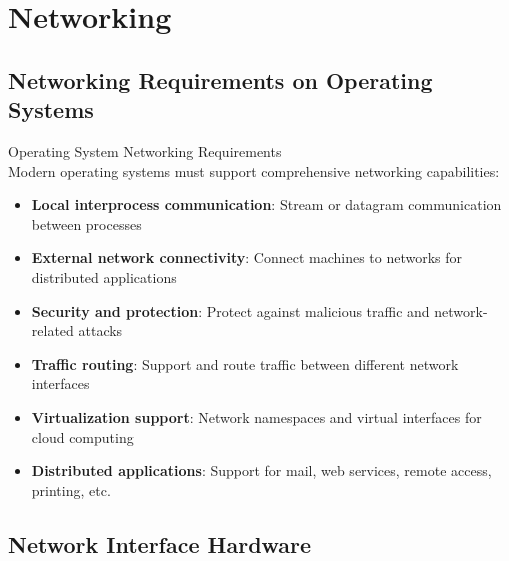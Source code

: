 \section{Networking}

\subsection{Networking Requirements on Operating Systems}

\begin{concept}{Operating System Networking Requirements}\\
    Modern operating systems must support comprehensive networking capabilities:
    \begin{itemize}
        \item \textbf{Local interprocess communication}: Stream or datagram communication between processes
        \item \textbf{External network connectivity}: Connect machines to networks for distributed applications
        \item \textbf{Security and protection}: Protect against malicious traffic and network-related attacks
        \item \textbf{Traffic routing}: Support and route traffic between different network interfaces
        \item \textbf{Virtualization support}: Network namespaces and virtual interfaces for cloud computing
        \item \textbf{Distributed applications}: Support for mail, web services, remote access, printing, etc.
    \end{itemize}
\end{concept}

\subsection{Network Interface Hardware}

